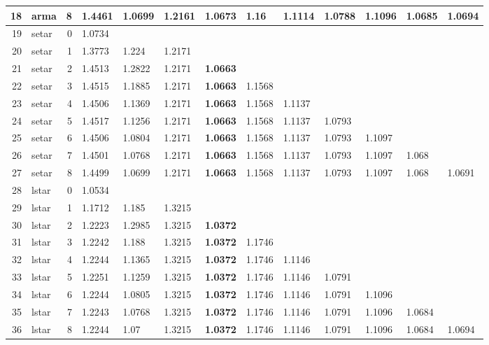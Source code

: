 \documentclass[10pt,a4paper]{article}
\begin{document}
\begin{table}[ht]
\begin{tabular}{rlrllllllllll}
  18 & arma &     8 & 1.4461 & 1.0699 & 1.2161 & 1.0673 & 1.16 & 1.1114 & 1.0788 & 1.1096 & 1.0685 & 1.0694 \\ 
   \hline
19 & setar &     0 & 1.0734 &  &  &  &  &  &  &  &  &  \\ 
  20 & setar &     1 & 1.3773 & 1.224 & 1.2171 &  &  &  &  &  &  &  \\ 
  21 & setar &     2 & 1.4513 & 1.2822 & 1.2171 & \textbf{1.0663} &  &  &  &  &  &  \\ 
  22 & setar &     3 & 1.4515 & 1.1885 & 1.2171 & \textbf{1.0663} & 1.1568 &  &  &  &  &  \\ 
  23 & setar &     4 & 1.4506 & 1.1369 & 1.2171 & \textbf{1.0663} & 1.1568 & 1.1137 &  &  &  &  \\ 
  24 & setar &     5 & 1.4517 & 1.1256 & 1.2171 & \textbf{1.0663} & 1.1568 & 1.1137 & 1.0793 &  &  &  \\ 
  25 & setar &     6 & 1.4506 & 1.0804 & 1.2171 & \textbf{1.0663} & 1.1568 & 1.1137 & 1.0793 & 1.1097 &  &  \\ 
  26 & setar &     7 & 1.4501 & 1.0768 & 1.2171 & \textbf{1.0663} & 1.1568 & 1.1137 & 1.0793 & 1.1097 & 1.068 &  \\ 
  27 & setar &     8 & 1.4499 & 1.0699 & 1.2171 & \textbf{1.0663} & 1.1568 & 1.1137 & 1.0793 & 1.1097 & 1.068 & 1.0691 \\ 
   \hline
28 & lstar &     0 & 1.0534 &  &  &  &  &  &  &  &  &  \\ 
  29 & lstar &     1 & 1.1712 & 1.185 & 1.3215 &  &  &  &  &  &  &  \\ 
  30 & lstar &     2 & 1.2223 & 1.2985 & 1.3215 & \textbf{1.0372} &  &  &  &  &  &  \\ 
  31 & lstar &     3 & 1.2242 & 1.188 & 1.3215 & \textbf{1.0372} & 1.1746 &  &  &  &  &  \\ 
  32 & lstar &     4 & 1.2244 & 1.1365 & 1.3215 & \textbf{1.0372} & 1.1746 & 1.1146 &  &  &  &  \\ 
  33 & lstar &     5 & 1.2251 & 1.1259 & 1.3215 & \textbf{1.0372} & 1.1746 & 1.1146 & 1.0791 &  &  &  \\ 
  34 & lstar &     6 & 1.2244 & 1.0805 & 1.3215 & \textbf{1.0372} & 1.1746 & 1.1146 & 1.0791 & 1.1096 &  &  \\ 
  35 & lstar &     7 & 1.2243 & 1.0768 & 1.3215 & \textbf{1.0372} & 1.1746 & 1.1146 & 1.0791 & 1.1096 & 1.0684 &  \\ 
  36 & lstar &     8 & 1.2244 & 1.07 & 1.3215 & \textbf{1.0372} & 1.1746 & 1.1146 & 1.0791 & 1.1096 & 1.0684 & 1.0694 \\ 

\end{tabular}
\end{table}
\end{document}
